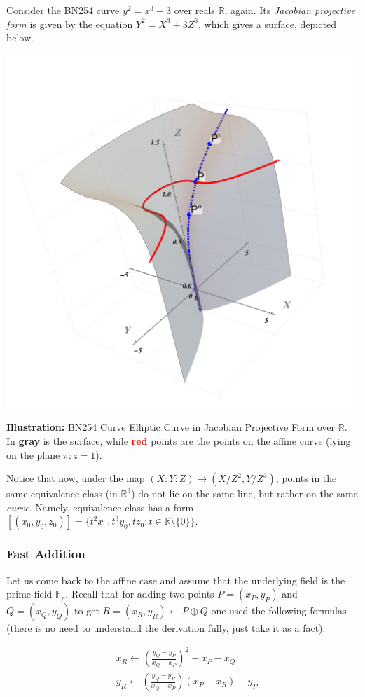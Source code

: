 \documentclass[../lecture-notes.tex]{subfiles}
\begin{document}
\begin{example}
    Consider the BN254 curve $y^2 = x^3 + 3$ over reals $\mathbb{R}$, again. Its \textit{Jacobian projective form} is given by the equation $Y^2 = X^3 + 3Z^6$, which gives a surface, depicted below.
    \begin{center}
        \includegraphics[trim={275 140 225 100}, width=0.35\linewidth, clip]{images/lecture_4/projective_ec_jacobian.pdf}
        
        \small{\textbf{Illustration:} BN254 Curve Elliptic Curve in Jacobian Projective Form over $\mathbb{R}$. In \textcolor{black!80}{\textbf{gray}} is the surface, while \textcolor{red}{\textbf{red}} points are the points on the affine curve (lying on the plane $\pi: z=1$).}
    \end{center}

    \vspace{-1mm}
    
    Notice that now, under the map $(X:Y:Z) \mapsto (X/Z^2,Y/Z^3)$, points in the same equivalence class (in $\mathbb{R}^3$) do not lie on the same line, but rather on the same \textit{curve}. Namely, equivalence class has a form $[(x_0,y_0,z_0)] = \{t^2x_0,t^3y_0,tz_0: t \in \mathbb{R} \setminus \{0\}\}$.
\end{example}

\subsubsection{Fast Addition}

Let us come back to the affine case and assume that the underlying field is the prime field $\mathbb{F}_p$. Recall that for adding two points $P=(x_P,y_P)$ and $Q=(x_Q,y_Q)$ to get $R=(x_R,y_R) \gets P \oplus Q$ one used the following formulas (there is no need to understand the derivation fully, just take it as a fact):

\begin{equation*}
    \begin{aligned}
        &x_R \gets \left(\frac{y_Q-y_P}{x_Q-x_P}\right)^2 - x_P - x_Q, \\ 
        &y_R \gets \left(\frac{y_Q-y_P}{x_Q-x_P}\right)(x_P-x_R) - y_P        
    \end{aligned}
\end{equation*}
\end{document}
